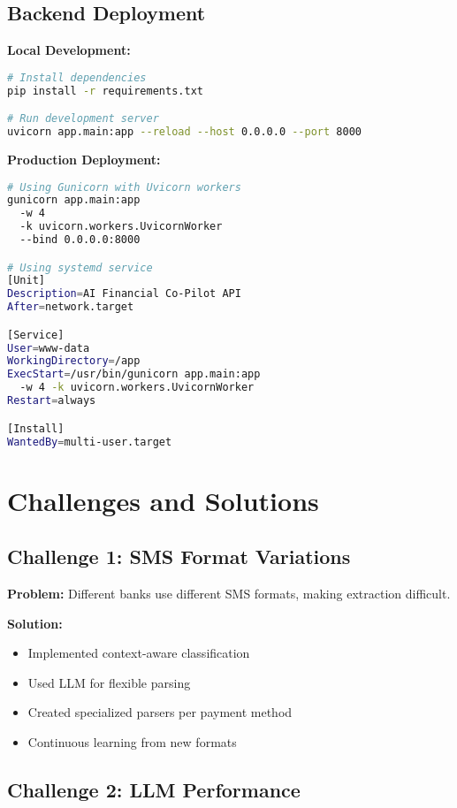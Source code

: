\documentclass[11pt,a4paper]{report}
\begin{document}
\begin{itemize}
\begin{itemize}
\subsection{Backend Deployment}

\textbf{Local Development:}
\begin{lstlisting}[language=bash]
# Install dependencies
pip install -r requirements.txt

# Run development server
uvicorn app.main:app --reload --host 0.0.0.0 --port 8000
\end{lstlisting}

\textbf{Production Deployment:}
\begin{lstlisting}[language=bash]
# Using Gunicorn with Uvicorn workers
gunicorn app.main:app 
  -w 4 
  -k uvicorn.workers.UvicornWorker 
  --bind 0.0.0.0:8000

# Using systemd service
[Unit]
Description=AI Financial Co-Pilot API
After=network.target

[Service]
User=www-data
WorkingDirectory=/app
ExecStart=/usr/bin/gunicorn app.main:app 
  -w 4 -k uvicorn.workers.UvicornWorker
Restart=always

[Install]
WantedBy=multi-user.target
\end{lstlisting}

\section{Challenges and Solutions}

\subsection{Challenge 1: SMS Format Variations}

\textbf{Problem:} Different banks use different SMS formats, making extraction difficult.

\textbf{Solution:}
\begin{itemize}
    \item Implemented context-aware classification
    \item Used LLM for flexible parsing
    \item Created specialized parsers per payment method
    \item Continuous learning from new formats
\end{itemize}

\subsection{Challenge 2: LLM Performance}


\end{itemize}
\end{itemize}
\end{document}
